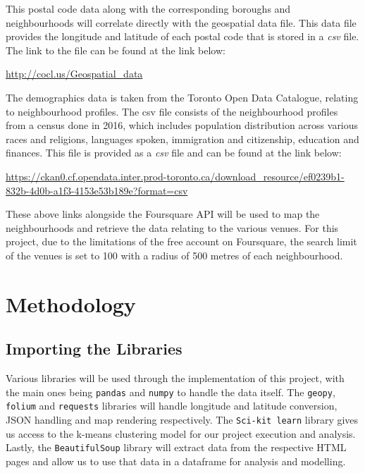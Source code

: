 \documentclass[12pt, conference]{IEEEtran}
\def\code#1{\texttt{#1}}
\begin{document}
This postal code data along with the corresponding boroughs and neighbourhoods will correlate directly with the geospatial data file. This data file provides the longitude and latitude of each postal code that is stored in a \textit{csv} file. The link to the file can be found at the link below:

\begin{center}
\url{http://cocl.us/Geospatial_data}
\end{center}

The demographics data is taken from the Toronto Open Data Catalogue, relating to neighbourhood profiles. The csv file consists of the neighbourhood profiles from a census done in 2016, which includes population distribution across various races and religions, languages spoken, immigration and citizenship, education and finances. This file is provided as a \textit{csv} file and can be found at the link below:

\begin{center}
\url{https://ckan0.cf.opendata.inter.prod-toronto.ca/download_resource/ef0239b1-832b-4d0b-a1f3-4153e53b189e?format=csv}
\end{center}

These above links alongside the Foursquare API will be used to map the neighbourhoods and retrieve the data relating to the various venues. For this project, due to the limitations of the free account on Foursquare, the search limit of the venues is set to 100 with a radius of 500 metres of each neighbourhood.

\section{\textbf{Methodology}}
\label{sec: Methodology}

\subsection{Importing the Libraries}
\label{sec: Libraries}
Various libraries will be used through the implementation of this project, with the main ones being \code{pandas} and \code{numpy} to handle the data itself. The \code{geopy}, \code{folium} and \code{requests} libraries will handle longitude and latitude conversion, JSON handling and map rendering respectively. The \code{Sci-kit learn} library gives us access to the k-means clustering model for our project execution and analysis. Lastly, the \code{BeautifulSoup} library will extract data from the respective HTML pages and allow us to use that data in a dataframe for analysis and modelling.
\end{document}

